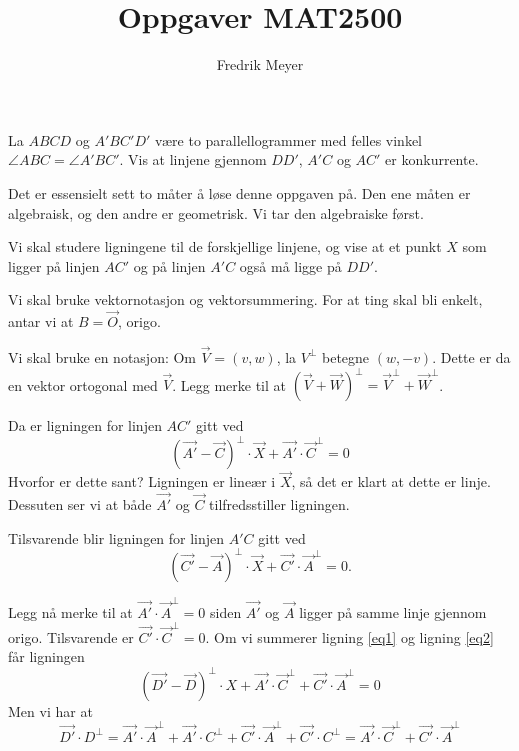 \documentclass[11pt, norsk]{article}
\begin{document}
\title{Oppgaver MAT2500}
\author{Fredrik Meyer}
\maketitle 

\begin{oppg}
  La $ABCD$ og $A'BC'D'$ være to parallellogrammer med felles vinkel $\angle ABC= \angle A'BC'$. Vis at linjene gjennom $DD'$, $A'C$ og $AC'$ er konkurrente.
\end{oppg}
\begin{losn}
Det er essensielt sett to måter å løse denne oppgaven på. Den ene måten er algebraisk, og den andre er geometrisk. Vi tar den algebraiske først.

Vi skal studere ligningene til de forskjellige linjene, og vise at et punkt $X$ som ligger på linjen $AC'$ og på linjen $A'C$ også må ligge på $DD'$. 

Vi skal bruke vektornotasjon og vektorsummering. For at ting skal bli enkelt, antar vi at $B = \vec O$, origo.

Vi skal bruke en notasjon: Om $\vec V = (v,w)$, la $V^\perp$ betegne $(w,-v)$. Dette er da en vektor ortogonal med $\vec V$. Legg merke til at $(\vec V + \vec W)^\perp = \vec V^\perp + \vec W^\perp$. 

Da er ligningen for linjen $AC'$ gitt ved
\begin{equation}
\label{eq1}
(\vec {A'} - \vec{C})^\perp \cdot \vec X + \vec{A'} \cdot \vec C^\perp = 0
\end{equation}
Hvorfor er dette sant? Ligningen er lineær i $\vec X$, så det er klart at dette er linje. Dessuten ser vi at både $\vec {A'}$ og $\vec C$ tilfredsstiller ligningen.

Tilsvarende blir ligningen for linjen $A'C$ gitt ved
\begin{equation}
\label{eq2}
(\vec {C'}-\vec{A})^\perp \cdot \vec X + \vec {C'} \cdot \vec {A}^\perp = 0.  
\end{equation}

Legg nå merke til at $\vec {A'} \cdot \vec A^\perp=0$ siden $\vec {A'}$ og $\vec A$ ligger på samme linje gjennom origo. Tilsvarende er $\vec {C'} \cdot \vec C^\perp = 0$. Om vi summerer ligning \eqref{eq1} og ligning \eqref{eq2} får ligningen
\begin{equation}
\label{eq3}
(\vec{D'} - \vec D)^\perp \cdot X + \vec{A'} \cdot \vec C^\perp + \vec {C'} \cdot \vec{A}^\perp = 0
\end{equation}
Men vi har at $$\vec {D'} \cdot D^\perp = \vec {A'} \cdot \vec A^\perp + \vec{A'} \cdot C^\perp + \vec{C'} \cdot \vec A^\perp + \vec {C'} \cdot C^\perp = \vec{A'} \cdot \vec C^\perp + \vec {C'} \cdot \vec{A}^\perp$$


\end{losn}
\end{document}
